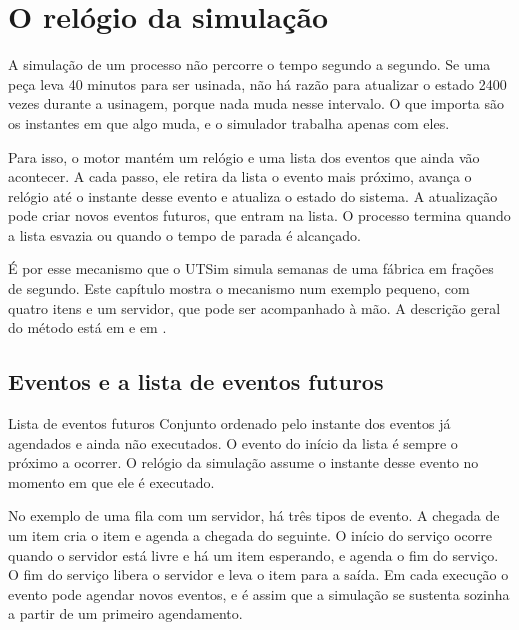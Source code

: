 \chapter{O relógio da simulação}
\label{cap-relogio}


A simulação de um processo não percorre o tempo segundo a segundo. Se uma peça leva 40 minutos para ser usinada, não há razão para atualizar o estado 2400 vezes durante a usinagem, porque nada muda nesse intervalo. O que importa são os instantes em que algo muda, e o simulador trabalha apenas com eles.

Para isso, o motor mantém um relógio e uma lista dos eventos que ainda vão acontecer. A cada passo, ele retira da lista o evento mais próximo, avança o relógio até o instante desse evento e atualiza o estado do sistema. A atualização pode criar novos eventos futuros, que entram na lista. O processo termina quando a lista esvazia ou quando o tempo de parada é alcançado.

É por esse mecanismo que o UTSim simula semanas de uma fábrica em frações de segundo. Este capítulo mostra o mecanismo num exemplo pequeno, com quatro itens e um servidor, que pode ser acompanhado à mão. A descrição geral do método está em \textcite{law2015} e em \textcite{banks2010}.

\section{Eventos e a lista de eventos futuros}

\begin{definicao}{Lista de eventos futuros}
Conjunto ordenado pelo instante dos eventos já agendados e ainda não executados. O evento do início da lista é sempre o próximo a ocorrer. O relógio da simulação assume o instante desse evento no momento em que ele é executado.
\end{definicao}

No exemplo de uma fila com um servidor, há três tipos de evento. A chegada de um item cria o item e agenda a chegada do seguinte. O início do serviço ocorre quando o servidor está livre e há um item esperando, e agenda o fim do serviço. O fim do serviço libera o servidor e leva o item para a saída. Em cada execução o evento pode agendar novos eventos, e é assim que a simulação se sustenta sozinha a partir de um primeiro agendamento.

